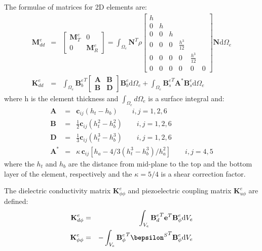 \documentclass[a4paper,12pt]{article}
\newcommand{\rmd}{\mathrm{d}}
\begin{document}
{The formulae of matrices for 2D elements are:
\begin{eqnarray}
\textbf{M}_{dd}^e & = & 
\left [
\begin{array}{cc}
\textbf{M}_T^e & 0\\
0 & \textbf{M}_R^e
\end{array}
\right] =
\int_{\Omega_e}\textbf{N}^T\rho 
\left [
\begin{array}{cccccc}
h &  & &  &  &\\
0 & h & & & &\\
0 & 0 & h & & & \\
0 & 0 & 0 & \frac{h^3}{12} & &\\
0 & 0 & 0 & 0 & \frac{h^3}{12} &\\
0 & 0 & 0 & 0 & 0 & 0
\end{array} \right]
\textbf{N}\rmd \Omega_e\\
\textbf{K}_{dd}^e & = & \int_{\Omega_e}{\textbf{B}_b^e}^T
\left[
\begin{array}{cc}
\textbf{A} & \textbf{B}\\
\textbf{B} & \textbf{D}
\end{array} \right]
\textbf{B}_b^e\rmd \Omega_e+\int_{\Omega_e}{\textbf{B}_s^e}^T\textbf{A}^{\ast}\textbf{B}_s^e\rmd \Omega_e
\end{eqnarray}
where h is the element thickness and \(\int_{\Omega_e}d\Omega_e\) is a surface 
integral and:
\begin{eqnarray}
\textbf{A} & = & \textbf{c}_{ij}(h_t-h_b)\qquad i,j=1,2,6\nonumber\\
\textbf{B} & = & \frac{1}{2}\textbf{c}_{ij}(h_t^2-h_b^2)\qquad i,j=1,2,6\nonumber\\
\textbf{D} & = & \frac{1}{3}\textbf{c}_{ij}(h_t^3-h_b^3)\qquad i,j=1,2,6\nonumber\\
\textbf{A}^{\ast} & = & \kappa \, \textbf{c}_{ij}\left[h_a-4/3\left(h_t^3-h_b^3\right)/h_a^2\right]\qquad i,j=4,5\nonumber
\end{eqnarray}
where the \(h_t\) and \(h_b\) are the distance from mid-plane to the top and 
the bottom layer of the element, respectively and the \(\kappa=5/4\) is a shear 
correction factor.

The dielectric conductivity matrix \(\textbf{K}_{\phi \phi}^e\) and 
piezoelectric coupling matrix \(\textbf{K}_{u \phi}^e\) are defined:
\begin{eqnarray}
\textbf{K}_{d\phi}^e & = & \int_{V_e}{\textbf{B}_d^e}^T\textbf{e}^T \textbf{B}_{\phi}^e\rmd V_e\\
\textbf{K}_{\phi \phi}^e & = & -\int_{V_e}{\textbf{B}_{\phi}^e}^T 
{\textbf{\(\bepsilon\)}^S}^T \textbf{B}_{\phi}^e\rmd V_e
\end{eqnarray}

}
\end{document}
